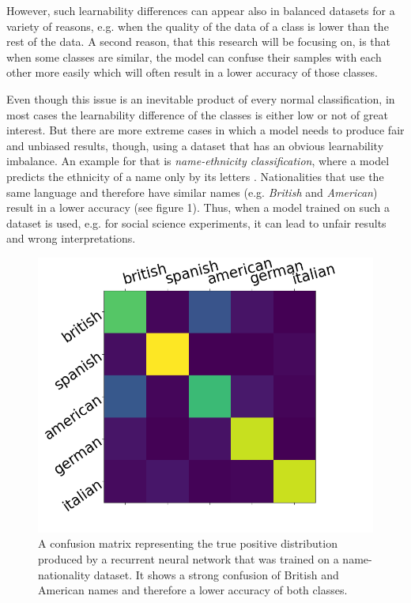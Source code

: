 \documentclass[journal]{IEEEtran}
\begin{document}
However, such learnability differences can appear also in balanced datasets for a variety of reasons, e.g. when the quality of the data of a class is lower than the rest of the data.
A second reason, that this research will be focusing on, is that when some classes are similar,
the model can confuse their samples with each other more easily which will often result in a lower accuracy of those classes.

Even though this issue is an inevitable product of every normal classification, in most cases the learnability difference of the classes is either low or not of great interest.
But there are more extreme cases in which a model needs to produce fair and unbiased results, though, using a dataset that has an obvious learnability imbalance. 
An example for that is \emph{name-ethnicity classification}, where a model predicts the ethnicity of a name only by its letters \cite{mateos2007review}. 
Nationalities that use the same language and therefore have similar names (e.g. \emph{British} and \emph{American}) result in a lower accuracy (see figure 1).
Thus, when a model trained on such a dataset is used, e.g. for social science experiments, it can lead to unfair results and wrong interpretations. 

\begin{figure}[h!]
        \includegraphics[width=\linewidth]{images/Figure_1.png}
        \caption{A confusion matrix representing the true positive distribution produced by a recurrent neural network that was trained on a name-nationality dataset.
                It shows a strong confusion of British and American names and therefore a lower accuracy of both classes.}
        \label{fig:tp_scores}
\end{figure}
\end{document}
